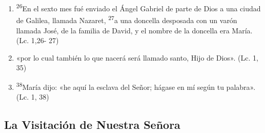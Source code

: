 \documentclass[a4paper,11pt]{article}
\begin{document}
\begin{enumerate}
        \item \textsuperscript{26}En el sexto mes fué enviado el Ángel Gabriel de parte de Dios a una ciudad de Galilea, llamada Nazaret, \textsuperscript{27}a una 
        doncella desposada con un varón llamada José, de la familia de David, y el nombre de la doncella era María. (Lc. 1,26- 27)

        \item «por lo cual también lo que nacerá será llamado santo, Hijo de Dios». (Lc. 1, 35)

        \item \textsuperscript{38}María dijo: «he aquí la esclava del Señor; hágase en mí según tu palabra». (Lc. 1, 38)

      \end{enumerate}
            
    \subsection*{\hfil La Visitación de Nuestra Señora \hfil}
      
\end{document}

